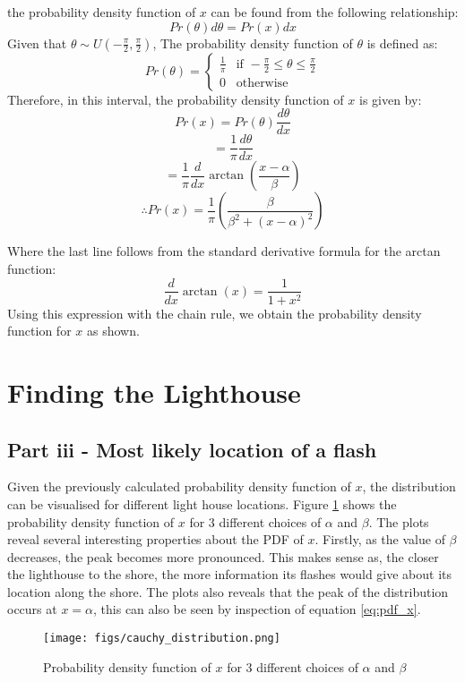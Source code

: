 \documentclass[11pt]{article}
\begin{document}
the probability density function of \( x \) can be found from the following relationship:
\[
Pr(\theta)d\theta = Pr(x)dx
\]
Given that \( \theta \sim U(-\frac{\pi}{2}, \frac{\pi}{2}) \),
The probability density function of \( \theta \) is defined as:
\[
Pr(\theta) = \left\{
    \begin{array}{ll}
        \frac{1}{\pi} & \text{if } -\frac{\pi}{2} \leq \theta \leq \frac{\pi}{2} \\
        0 & \text{otherwise}
    \end{array}
\right.
\]
Therefore, in this interval, the probability density function of \( x \) is given by:
$$
Pr(x) = Pr(\theta)\frac{d\theta}{dx} 
$$
$$
= \frac{1}{\pi} \frac{d\theta}{dx}
$$
$$
= \frac{1}{\pi} \frac{d}{dx} \arctan \left( \frac{x-\alpha}{\beta} \right)
$$
\begin{equation}
\therefore Pr(x) = \frac{1}{\pi} \left( \frac{\beta}{\beta^2 + (x-\alpha)^2} \right)
\label{eq:pdf_x}
\end{equation}

Where the last line follows from the standard derivative formula for the arctan function:
\[
\frac{d}{dx} \arctan(x) = \frac{1}{1+x^2}
\]
Using this expression with the chain rule, we obtain the probability density function for \( x \) as shown.

\section{Finding the Lighthouse}
\subsection{Part iii - Most likely location of a flash}
Given the previously calculated probability density function of \( x \), the distribution can be visualised for different light house locations. Figure \ref{fig:cauchy_distribution} shows the probability density function of \( x \) for 3 different choices of \( \alpha \) and \( \beta \). The plots reveal several interesting properties about the PDF of $x$. Firstly, as the value of $\beta$ decreases, the peak
becomes more pronounced. This makes sense as, the closer the lighthouse to the shore, the more information its flashes would give about its location along the shore. The plots also reveals that the peak of the distribution occurs at $x=\alpha$, this can also be seen by inspection of equation \ref{eq:pdf_x}. 

\begin{figure}[H]
    \centering
    \texttt{[image: figs/cauchy\_distribution.png]}
    \caption{Probability density function of \( x \) for 3 different choices of \( \alpha \) and \( \beta \)}
    \label{fig:cauchy_distribution}
\end{figure}
\end{document}
